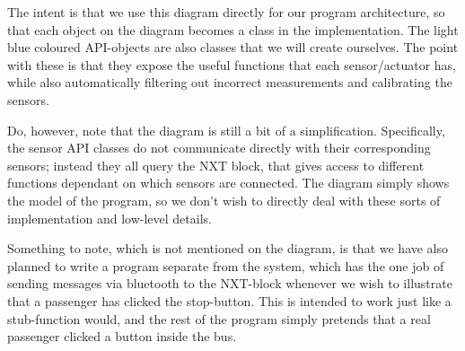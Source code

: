 The intent is that we use this diagram directly for our program architecture, so that each object on the diagram becomes a class in the implementation. The light blue coloured API-objects are also classes that we will create ourselves. The point with these is that they expose the useful functions that each sensor/actuator has, while also automatically filtering out incorrect measurements and calibrating the sensors.

Do, however, note that the diagram is still a bit of a simplification. Specifically, the sensor API classes do not communicate directly with their corresponding sensors; instead they all query the NXT block, that gives access to different functions dependant on which sensors are connected. The diagram simply shows the model of the program, so we don't wish to directly deal with these sorts of implementation and low-level details. 

Something to note, which is not mentioned on the diagram, is that we have also planned to write a program separate from the system, which has the one job of sending messages via bluetooth to the NXT-block whenever we wish to illustrate that a passenger has clicked the stop-button. This is intended to work just like a stub-function would, and the rest of the program simply pretends that a real passenger clicked a button inside the bus.

